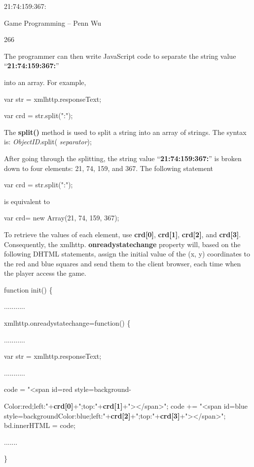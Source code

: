\documentclass[
]{article}
\begin{document}
21:74:159:367:

Game Programming -- Penn Wu

266

\protect\hypertarget{index_split_014.htmlux5cux23p267}{}{}The programmer
can then write JavaScript code to separate the string value
``\textbf{21:74:159:367:}''

into an array. For example,

var str = xmlhttp.responseText;

var crd = str.split(":");

The \textbf{split()} method is used to split a string into an array of
strings. The syntax is: \emph{ObjectID}.split( \emph{separator});

After going through the splitting, the string value
``\textbf{21:74:159:367:}'' is broken down to four elements: 21, 74,
159, and 367. The following statement

var crd = str.split(":");

is equivalent to

var crd= new Array(21, 74, 159, 367);

To retrieve the values of each element, use \textbf{crd{[}0{]}},
\textbf{crd{[}1{]}}, \textbf{crd{[}2{]}}, and \textbf{crd{[}3{]}}.
Consequently, the xmlhttp. \textbf{onreadystatechange} property will,
based on the following DHTML statements, assign the initial value of the
(x, y) coordinates to the red and blue squares and send them to the
client browser, each time when the player access the game.

function init() \{

...........

xmlhttp.onreadystatechange=function() \{

...........

var str = xmlhttp.responseText;

...........

code = "\textless span id=\textquotesingle red\textquotesingle{}
style=\textquotesingle background-

Color:red;left:"+\textbf{crd{[}0{]}}+";top:"+\textbf{crd{[}1{]}}+"\textquotesingle\textgreater\textless/span\textgreater";
code += "\textless span id=\textquotesingle blue\textquotesingle{}
style=\textquotesingle backgroundColor:blue;left:"+\textbf{crd{[}2{]}}+";top:"+\textbf{crd{[}3{]}}+"\textquotesingle\textgreater\textless/span\textgreater";
bd.innerHTML = code;

.......

\}
\end{document}
